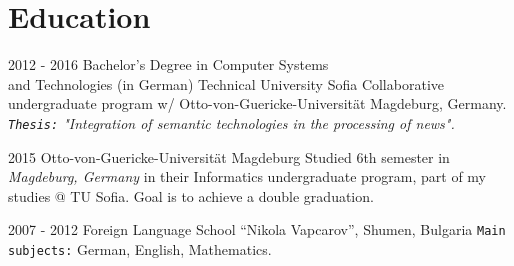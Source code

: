 \documentclass[]{friggeri-cv}
\begin{document}
\section{Education}
\begin{entrylist}
    \entry
    {2012 - 2016}
    {Bachelor's Degree in Computer Systems\\ and Technologies (in German)}
    {Technical University Sofia}
    {Collaborative undergraduate program w/ Otto-von-Guericke-Universität Magdeburg, Germany.\\
    \emph{\texttt{Thesis:} "Integration of semantic technologies in the processing of news".}}
    
    \entry
    {2015}
    {}
    {Otto-von-Guericke-Universität Magdeburg}
    {Studied 6th semester in \textit{Magdeburg, Germany} in their Informatics undergraduate program, part of my studies @ TU Sofia. Goal is to achieve a double graduation. }
    
    \entry
    {2007 - 2012}
    {}
    {Foreign Language School “Nikola Vapcarov”, Shumen, Bulgaria}
    {\texttt{Main subjects:} German, English, Mathematics.}
\end{entrylist}
\end{document}
